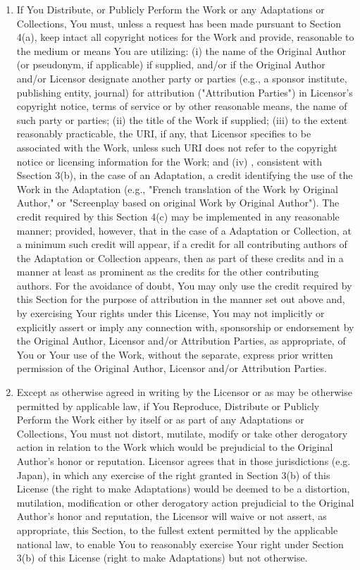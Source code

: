 \begin{enumerate}
\item If You Distribute, or Publicly Perform the Work or
  any Adaptations or Collections, You must, unless a
  request has been made pursuant to Section 4(a), keep
  intact all copyright notices for the Work and provide,
  reasonable to the medium or means You are utilizing: (i)
  the name of the Original Author (or pseudonym, if
  applicable) if supplied, and/or if the Original Author
  and/or Licensor designate another party or parties (e.g.,
  a sponsor institute, publishing entity, journal) for
  attribution ("Attribution Parties") in Licensor's
  copyright notice, terms of service or by other reasonable
  means, the name of such party or parties; (ii) the title
  of the Work if supplied; (iii) to the extent reasonably
  practicable, the URI, if any, that Licensor specifies to
  be associated with the Work, unless such URI does not
  refer to the copyright notice or licensing information
  for the Work; and (iv) , consistent with Ssection 3(b),
  in the case of an Adaptation, a credit identifying the
  use of the Work in the Adaptation (e.g., "French
  translation of the Work by Original Author," or
  "Screenplay based on original Work by Original Author").
  The credit required by this Section 4(c) may be
  implemented in any reasonable manner; provided, however,
  that in the case of a Adaptation or Collection, at a
  minimum such credit will appear, if a credit for all
  contributing authors of the Adaptation or Collection
  appears, then as part of these credits and in a manner at
  least as prominent as the credits for the other
  contributing authors. For the avoidance of doubt, You may
  only use the credit required by this Section for the
  purpose of attribution in the manner set out above and,
  by exercising Your rights under this License, You may not
  implicitly or explicitly assert or imply any connection
  with, sponsorship or endorsement by the Original Author,
  Licensor and/or Attribution Parties, as appropriate, of
  You or Your use of the Work, without the separate,
  express prior written permission of the Original Author,
  Licensor and/or Attribution Parties.

\item Except as otherwise agreed in writing by the Licensor
  or as may be otherwise permitted by applicable law, if
  You Reproduce, Distribute or Publicly Perform the Work
  either by itself or as part of any Adaptations or
  Collections, You must not distort, mutilate, modify or
  take other derogatory action in relation to the Work
  which would be prejudicial to the Original Author's honor
  or reputation. Licensor agrees that in those
  jurisdictions (e.g. Japan), in which any exercise of the
  right granted in Section 3(b) of this License (the right
  to make Adaptations) would be deemed to be a distortion,
  mutilation, modification or other derogatory action
  prejudicial to the Original Author's honor and
  reputation, the Licensor will waive or not assert, as
  appropriate, this Section, to the fullest extent
  permitted by the applicable national law, to enable You
  to reasonably exercise Your right under Section 3(b) of
  this License (right to make Adaptations) but not
  otherwise.


\end{enumerate}
